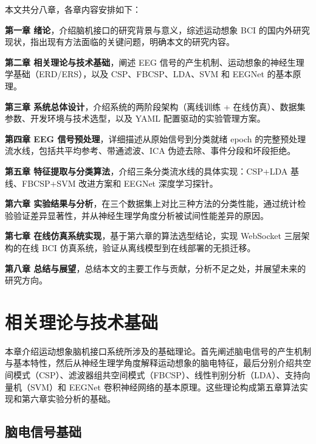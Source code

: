 本文共分八章，各章内容安排如下：

\textbf{第一章 绪论}，介绍脑机接口的研究背景与意义，综述运动想象 BCI 的国内外研究现状，指出现有方法面临的关键问题，明确本文的研究内容。

\textbf{第二章 相关理论与技术基础}，阐述 EEG 信号的产生机制、运动想象的神经生理学基础（ERD/ERS），以及 CSP、FBCSP、LDA、SVM 和 EEGNet 的基本原理。

\textbf{第三章 系统总体设计}，介绍系统的两阶段架构（离线训练 + 在线仿真）、数据集参数、开发环境与技术选型，以及 YAML 配置驱动的实验管理方案。

\textbf{第四章 EEG 信号预处理}，详细描述从原始信号到分类就绪 epoch 的完整预处理流水线，包括共平均参考、带通滤波、ICA 伪迹去除、事件分段和坏段拒绝。

\textbf{第五章 特征提取与分类算法}，介绍三条分类流水线的具体实现：CSP+LDA 基线、FBCSP+SVM 改进方案和 EEGNet 深度学习探针。

\textbf{第六章 实验结果与分析}，在三个数据集上对比三种方法的分类性能，通过统计检验验证差异显著性，并从神经生理学角度分析被试间性能差异的原因。

\textbf{第七章 在线仿真系统实现}，基于第六章的算法选型结论，实现 WebSocket 三层架构的在线 BCI 仿真系统，验证从离线模型到在线部署的无损迁移。

\textbf{第八章 总结与展望}，总结本文的主要工作与贡献，分析不足之处，并展望未来的研究方向。


\section{相关理论与技术基础}
\label{sec:theory}

本章介绍运动想象脑机接口系统所涉及的基础理论。首先阐述脑电信号的产生机制与基本特性，然后从神经生理学角度解释运动想象的脑电特征，最后分别介绍共空间模式（CSP）、滤波器组共空间模式（FBCSP）、线性判别分析（LDA）、支持向量机（SVM）和 EEGNet 卷积神经网络的基本原理。这些理论构成第五章算法实现和第六章实验分析的基础。

\subsection{脑电信号基础}
\label{sec:eeg-basics}


